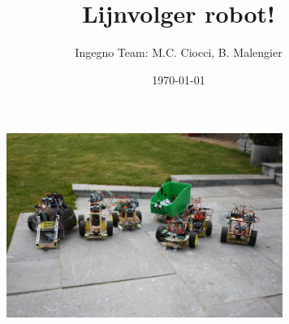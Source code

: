 \documentclass[11pt,a4paper]{article}
\newcommand{\nedt}[1]{{#1}}
\newcommand{\engt}[1]{ }
\begin{document}
 \title{Lijnvolger robot!}
 \author{Ingegno Team: M.C. Ciocci, B. Malengier}
 \date{\today}
 \maketitle

\begin{figure}[h]
  \centering
  \includegraphics[width=9cm]{pic/robotteam.jpg}
\label{f:ingrobots}       %
\end{figure}

\begin{Parallel}{7.5cm}{7.5cm}



\end{Parallel}
\end{document}

